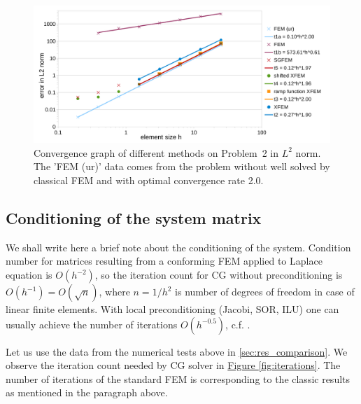 \documentclass{elsarticle}
\newcommand{\prob}[1]{Problem~{#1}}
\newcommand{\fig}[1]{\hyperref[#1]{Figure \ref{#1}}}
\begin{document}
\begin{figure}[!htb]
  \centering    
  \includegraphics[width=\textwidth]{results/convergence_sin.pdf}
  \caption[Convergence graph \prob{2}]{Convergence graph of different methods on 
  \prob{2} in $L^2$ norm. The 'FEM (ur)'
  data comes from the problem without well solved by classical FEM and with optimal convergence rate 2.0.}
  \label{fig:convergence_sin}
\end{figure}

\subsection{Conditioning of the system matrix} \label{sec:res_conditioning}
We shall write here a brief note about the conditioning of the system.
Condition number for matrices resulting from a conforming FEM applied to Laplace equation is $O(h^{-2})$, so the iteration count 
for CG without preconditioning is $O(h^{-1})=O(\sqrt{n})$, where $n=1/h^2$ is number of degrees of freedom in case of linear finite elements. 
With local preconditioning (Jacobi, 
SOR, ILU) one can usually achieve the number of iterations $O(h^{-0.5})$, c.f. \cite{ern_evaluation_2006}.

Let us use the data from the numerical tests above in \ref{sec:res_comparison}.
We observe the iteration count needed by CG solver in \fig{fig:iterations}.
The number of iterations of the standard FEM is corresponding to the classic results as mentioned in the paragraph above. 
\end{document}
